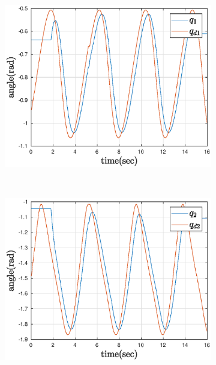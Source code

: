 \begin{figure}[htbp]
    \centering
    \begin{subfigure}[htbp]{0.45\textwidth}
        \centering
        \includegraphics[width = \picsSiz\linewidth]{img/pathF1.eps}
        \caption{}
    \end{subfigure}
    ~ 
    \begin{subfigure}[htbp]{0.45\textwidth}
        \centering
        \includegraphics[width = \picsSiz\linewidth]{img/pathF2.eps}
        \caption{}
    \end{subfigure}
    ~
    \centering
    \begin{subfigure}[htbp]{0.45\textwidth}

\end{subfigure}
\end{figure}
